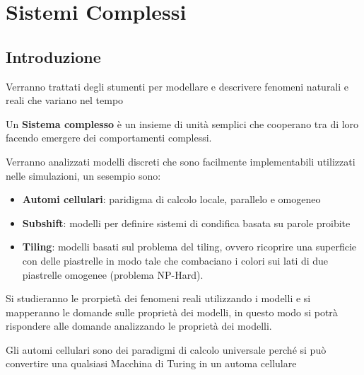 \chapter{Sistemi Complessi}
\section{Introduzione}
Verranno trattati degli stumenti per modellare e descrivere fenomeni naturali e reali
che variano nel tempo
\begin{definition}
    Un \textbf{Sistema complesso} è un insieme di unità semplici che cooperano tra
    di loro facendo emergere dei comportamenti complessi.
\end{definition}
Verranno analizzati modelli discreti che sono facilmente implementabili utilizzati
nelle simulazioni, un sesempio sono:
\begin{itemize}
    \item \textbf{Automi cellulari}: paridigma di calcolo locale, parallelo e omogeneo
    \item \textbf{Subshift}: modelli per definire sistemi di condifica basata su
    parole proibite
    \item \textbf{Tiling}: modelli basati sul problema del tiling, ovvero ricoprire
    una superficie con delle piastrelle in modo tale che combaciano i colori sui
    lati di due piastrelle omogenee (problema NP-Hard).
\end{itemize}

Si studieranno le prorpietà dei fenomeni reali utilizzando i modelli e si mapperanno
le domande sulle proprietà dei modelli, in questo modo si potrà rispondere alle 
domande analizzando le proprietà dei modelli.
\begin{note}
    Gli automi cellulari sono dei paradigmi di calcolo universale perché si 
    può convertire una qualsiasi Macchina di Turing in un automa cellulare
\end{note}